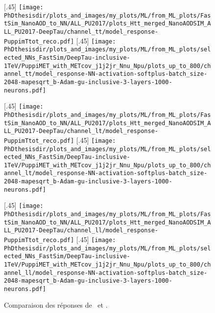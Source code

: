 \begin{figure}[p]
\centering

[.45\textwidth]
{\texttt{[image: \\PhDthesisdir/plots\_and\_images/my\_plots/ML/from\_ML\_plots/FastSim\_NanoAOD\_to\_NN/ALL\_PU2017/plots\_Htt\_merged\_NanoAODSIM\_ALL\_PU2017-DeepTau/channel\_tt/model\_response-PuppimTtot\_reco.pdf]}\vspace{-.5\baselineskip}}
\hfill
{}[.45\textwidth]
{\texttt{[image: \\PhDthesisdir/plots\_and\_images/my\_plots/ML/from\_ML\_plots/selected\_NNs\_FastSim/DeepTau-inclusive-1TeV/PuppiMET\_with\_METcov\_j1j2jr\_Nnu\_Npu/plots\_up\_to\_800/channel\_tt/model\_response-NN-activation-softplus-batch\_size-2048-mapesqrt\_b-Adam-gu-inclusive-3-layers-1000-neurons.pdf]}\vspace{-.5\baselineskip}}

[.45\textwidth]
{\texttt{[image: \\PhDthesisdir/plots\_and\_images/my\_plots/ML/from\_ML\_plots/FastSim\_NanoAOD\_to\_NN/ALL\_PU2017/plots\_Htt\_merged\_NanoAODSIM\_ALL\_PU2017-DeepTau/channel\_lt/model\_response-PuppimTtot\_reco.pdf]}\vspace{-.5\baselineskip}}
\hfill{}[.45\textwidth]
{\texttt{[image: \\PhDthesisdir/plots\_and\_images/my\_plots/ML/from\_ML\_plots/selected\_NNs\_FastSim/DeepTau-inclusive-1TeV/PuppiMET\_with\_METcov\_j1j2jr\_Nnu\_Npu/plots\_up\_to\_800/channel\_lt/model\_response-NN-activation-softplus-batch\_size-2048-mapesqrt\_b-Adam-gu-inclusive-3-layers-1000-neurons.pdf]}\vspace{-.5\baselineskip}}

[.45\textwidth]
{\texttt{[image: \\PhDthesisdir/plots\_and\_images/my\_plots/ML/from\_ML\_plots/FastSim\_NanoAOD\_to\_NN/ALL\_PU2017/plots\_Htt\_merged\_NanoAODSIM\_ALL\_PU2017-DeepTau/channel\_ll/model\_response-PuppimTtot\_reco.pdf]}\vspace{-.5\baselineskip}}
\hfill
{}[.45\textwidth]
{\texttt{[image: \\PhDthesisdir/plots\_and\_images/my\_plots/ML/from\_ML\_plots/selected\_NNs\_FastSim/DeepTau-inclusive-1TeV/PuppiMET\_with\_METcov\_j1j2jr\_Nnu\_Npu/plots\_up\_to\_800/channel\_ll/model\_response-NN-activation-softplus-batch\_size-2048-mapesqrt\_b-Adam-gu-inclusive-3-layers-1000-neurons.pdf]}\vspace{-.5\baselineskip}}

\caption{Comparaison des réponses de \mTtot\ et \mml.}
\label{fig-BpprimevsMTTOT-resp}
\end{figure}
